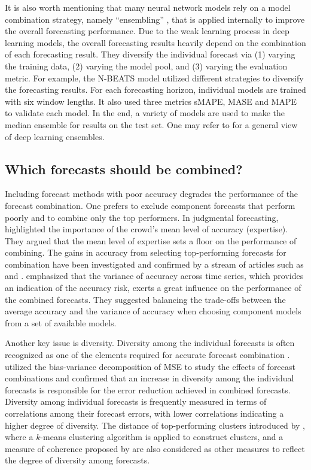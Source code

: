 \documentclass[a4paper,11pt]{article}
\begin{document}
It is also worth mentioning that many neural network models rely on a model combination strategy, namely ``ensembling'' \citep[see, e.g.,][a popular work in the machine learning context]{Caruana2004-en}, that is applied internally to improve the overall forecasting performance. Due to the weak learning process in deep learning models, the overall forecasting results heavily depend on the combination of each forecasting result. They diversify the individual forecast via (1) varying the training data, (2) varying the model pool, and (3) varying the evaluation metric. For example, the N-BEATS model \citep{Oreshkin2019-nb} utilized different strategies to diversify the forecasting results. For each forecasting horizon, individual models are trained with six window lengths. It also used three metrics sMAPE, MASE and MAPE to validate each model. In the end, a variety of models are used to make the median ensemble for results on the test set. One may refer to \citet{Ganaie2022-ed} for a general view of deep learning ensembles.

\subsection{Which forecasts should be combined?}
\label{sec:forecasts}

Including forecast methods with poor accuracy degrades the performance of the forecast combination. One prefers to exclude component forecasts that perform poorly and to combine only the top performers. In judgmental forecasting, \citet{Mannes2014-dl} highlighted the importance of the crowd's mean level of accuracy (expertise). They argued that the mean level of expertise sets a floor on the performance of combining. The gains in accuracy from selecting top-performing forecasts for combination have been investigated and confirmed by a stream of articles such as \citet{Budescu2015-tu} and \citet{Kourentzes2019-na}. \citet{Lichtendahl2020-ut} emphasized that the variance of accuracy across time series, which provides an indication of the accuracy risk, exerts a great influence on the performance of the combined forecasts. They suggested balancing the trade-offs between the average accuracy and the variance of accuracy when choosing component models from a set of available models.

Another key issue is diversity. Diversity among the individual forecasts is often recognized as one of the elements required for accurate forecast combination \citep{Batchelor1995-ps,Brown2005-aa,Thomson2019-al}. \citet{Atiya2020-ge} utilized the bias-variance decomposition of MSE to study the effects of forecast combinations and confirmed that an increase in diversity among the individual forecasts is responsible for the error reduction achieved in combined forecasts. Diversity among individual forecasts is frequently measured in terms of correlations among their forecast errors, with lower correlations indicating a higher degree of diversity. The distance of top-performing clusters introduced by \citet{Lemke2010-wn}, where a $k$-means clustering algorithm is applied to construct clusters, and a measure of coherence proposed by \citet{Thomson2019-al} are also considered as other measures to reflect the degree of diversity among forecasts.
\end{document}
